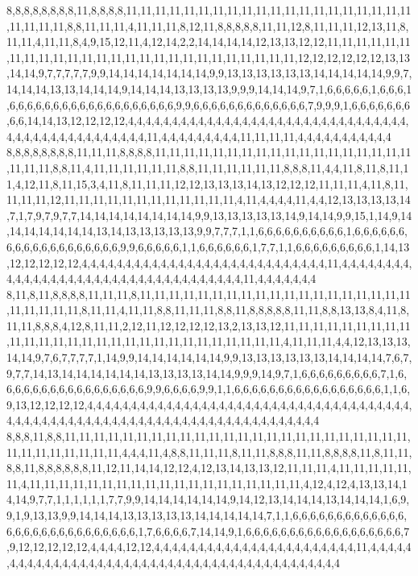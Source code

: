 8,8,8,8,8,8,8,8,11,8,8,8,8,11,11,11,11,11,11,11,11,11,11,11,11,11,11,11,11,11,11,11,11,11,11,11,11,8,8,11,11,11,4,11,11,11,8,12,11,8,8,8,8,8,11,11,12,8,11,11,11,12,13,11,8,11,11,4,11,11,8,4,9,15,12,11,4,12,14,2,2,14,14,14,14,12,13,13,12,12,11,11,11,11,11,11,11,11,11,11,11,11,11,11,11,11,11,11,11,11,11,11,11,11,11,11,12,12,12,12,12,12,13,13,14,14,9,7,7,7,7,7,9,9,14,14,14,14,14,14,14,9,9,13,13,13,13,13,13,14,14,14,14,14,9,9,7,14,14,14,13,13,14,14,14,9,14,14,14,13,13,13,13,9,9,9,14,14,14,9,7,1,6,6,6,6,6,1,6,6,6,1,6,6,6,6,6,6,6,6,6,6,6,6,6,6,6,6,6,6,6,9,9,6,6,6,6,6,6,6,6,6,6,6,6,6,7,9,9,9,1,6,6,6,6,6,6,6,6,6,14,14,13,12,12,12,12,4,4,4,4,4,4,4,4,4,4,4,4,4,4,4,4,4,4,4,4,4,4,4,4,4,4,4,4,4,4,4,4,4,4,4,4,4,4,4,4,4,4,4,4,4,4,4,4,11,4,4,4,4,4,4,4,4,4,11,11,11,11,4,4,4,4,4,4,4,4,4,4,4
8,8,8,8,8,8,8,8,11,11,11,8,8,8,8,11,11,11,11,11,11,11,11,11,11,11,11,11,11,11,11,11,11,11,11,11,8,8,11,4,11,11,11,11,11,11,8,8,11,11,11,11,11,11,8,8,8,11,4,4,11,8,11,8,11,11,4,12,11,8,11,15,3,4,11,8,11,11,11,12,12,13,13,13,14,13,12,12,12,11,11,11,4,11,8,11,11,11,11,12,11,11,11,11,11,11,11,11,11,11,11,11,4,11,4,4,4,4,11,4,4,12,13,13,13,13,14,7,1,7,9,7,9,7,7,14,14,14,14,14,14,14,14,9,9,13,13,13,13,13,14,9,14,14,9,9,15,1,14,9,14,14,14,14,14,14,14,13,14,13,13,13,13,13,9,9,7,7,7,1,1,6,6,6,6,6,6,6,6,6,6,1,6,6,6,6,6,6,6,6,6,6,6,6,6,6,6,6,6,6,6,9,9,6,6,6,6,6,1,1,6,6,6,6,6,6,1,7,7,1,1,6,6,6,6,6,6,6,6,6,1,14,13,12,12,12,12,12,4,4,4,4,4,4,4,4,4,4,4,4,4,4,4,4,4,4,4,4,4,4,4,4,4,4,4,4,11,4,4,4,4,4,4,4,4,4,4,4,4,4,4,4,4,4,4,4,4,4,4,4,4,4,4,4,4,4,4,4,4,4,4,4,11,4,4,4,4,4,4,4
8,11,8,11,8,8,8,8,11,11,11,8,11,11,11,11,11,11,11,11,11,11,11,11,11,11,11,11,11,11,11,11,11,11,11,11,8,11,11,4,11,11,8,8,11,11,11,8,8,11,8,8,8,8,8,11,11,8,8,13,13,8,4,11,8,11,11,8,8,8,4,12,8,11,11,2,12,11,12,12,12,12,13,2,13,13,12,11,11,11,11,11,11,11,11,11,11,11,11,11,11,11,11,11,11,11,11,11,11,11,11,11,11,11,11,4,11,11,11,4,4,12,13,13,13,14,14,9,7,6,7,7,7,7,1,14,9,9,14,14,14,14,14,14,9,9,13,13,13,13,13,13,14,14,14,14,7,6,7,9,7,7,14,13,14,14,14,14,14,14,13,13,13,13,14,14,9,9,9,14,9,7,1,6,6,6,6,6,6,6,6,6,7,1,6,6,6,6,6,6,6,6,6,6,6,6,6,6,6,6,6,9,9,6,6,6,6,9,9,1,1,6,6,6,6,6,6,6,6,6,6,6,6,6,6,6,6,6,1,1,6,9,13,12,12,12,12,4,4,4,4,4,4,4,4,4,4,4,4,4,4,4,4,4,4,4,4,4,4,4,4,4,4,4,4,4,4,4,4,4,4,4,4,4,4,4,4,4,4,4,4,4,4,4,4,4,4,4,4,4,4,4,4,4,4,4,4,4,4,4,4,4,4,4,4,4,4,4,4,4
8,8,8,11,8,8,11,11,11,11,11,11,11,11,11,11,11,11,11,11,11,11,11,11,11,11,11,11,11,11,11,11,11,11,11,11,11,11,4,4,4,11,4,8,8,11,11,11,8,11,11,8,8,8,11,11,8,8,8,8,11,8,11,11,8,8,11,8,8,8,8,8,8,11,12,11,14,14,12,12,4,12,13,14,13,13,12,11,11,11,4,11,11,11,11,11,11,4,11,11,11,11,11,11,11,11,11,11,11,11,11,11,11,11,11,11,11,4,12,4,12,4,13,13,14,14,14,9,7,7,1,1,1,1,1,1,7,7,9,9,14,14,14,14,14,14,9,14,12,13,14,14,14,13,14,14,14,1,6,9,9,1,9,13,13,9,9,14,14,14,13,13,13,13,13,14,14,14,14,14,7,1,1,6,6,6,6,6,6,6,6,6,6,6,6,6,6,6,6,6,6,6,6,6,6,6,6,6,6,6,6,1,7,6,6,6,6,7,14,14,9,1,6,6,6,6,6,6,6,6,6,6,6,6,6,6,6,6,6,6,7,9,12,12,12,12,12,4,4,4,4,12,12,4,4,4,4,4,4,4,4,4,4,4,4,4,4,4,4,4,4,4,4,4,4,4,11,4,4,4,4,4,4,4,4,4,4,4,4,4,4,4,4,4,4,4,4,4,4,4,4,4,4,4,4,4,4,4,4,4,4,4,4,4,4,4,4,4,4,4
